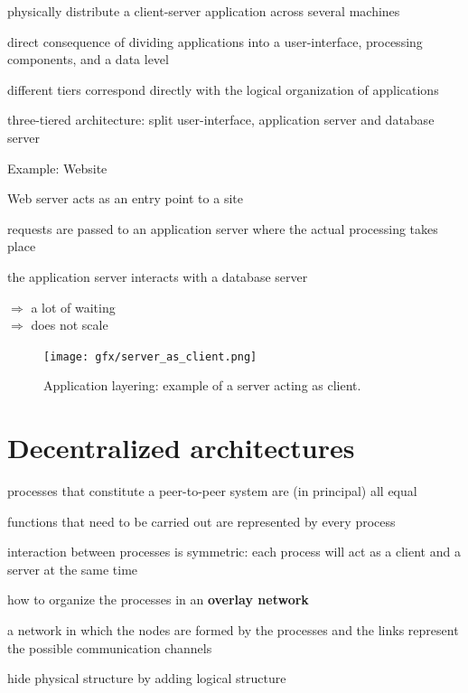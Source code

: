 \documentclass[ngerman,a4paper]{report}
\begin{document}
\begin{compactitem}
	\item physically distribute a client-server application across several machines
	\item direct consequence of dividing applications into a user-interface, processing components, and a data level
	\item different tiers correspond directly with the logical organization of applications
	\item three-tiered architecture: split user-interface, application server and database server
	\item Example: Website
	\begin{compactitem}
		\item Web server acts as an entry point to a site
		\item requests are passed to an application server where the actual processing takes place
		\item the application server interacts with a database server
	\end{compactitem}
\end{compactitem}
$\Rightarrow$ a lot of waiting\\
$\Rightarrow$ does not scale\\


\begin{figure}[h]
	\centering
	\texttt{[image: gfx/server\_as\_client.png]}
	\caption{Application layering: example of a server acting as client.}
	\label{img:cs_app_layer}
\end{figure}

\section{Decentralized architectures}

\begin{compactitem}
	\item processes that constitute a peer-to-peer system are (in principal) all equal
	\item functions that need to be carried out are represented by every process
	\item interaction between processes is symmetric: each process will act as a client and a server at the same time
	\item how to organize the processes in an \textbf{overlay network}
	\begin{compactitem}
		\item a network in which the nodes are formed by the processes and the links represent the possible communication channels 
		\item hide physical structure by adding logical structure
	\end{compactitem}
\end{compactitem}
	
\end{document}
